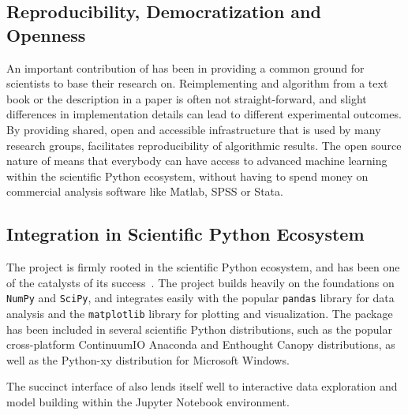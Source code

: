 \subsection{Reproducibility, Democratization and Openness}
An important contribution of \sklearn{} has been in providing a common
ground for scientists to base their research on. Reimplementing
and algorithm from a text book or the description in a paper is often not
straight-forward, and slight differences in implementation details can
lead to different experimental outcomes. By providing shared, open and 
accessible infrastructure that is used by many research groups,
\sklearn{} facilitates reproducibility of algorithmic results.
The open source nature of \sklearn{} means that everybody can have access
to advanced machine learning within the scientific Python ecosystem,
without having to spend money on commercial analysis software like Matlab,
SPSS or Stata.

\subsection{Integration in Scientific Python Ecosystem}
The \sklearn{} project is firmly rooted in the scientific Python ecosystem, and has been
one of the catalysts of its success~\autocite{benlorica, infoworld}. The \sklearn{} project{}
builds heavily on the foundations on \texttt{NumPy} and \texttt{SciPy}, and
integrates easily with the popular \texttt{pandas} library for data analysis and the
\texttt{matplotlib} library for plotting and visualization.
The \sklearn{} package has been included in several scientific Python distributions, such
as the popular cross-platform ContinuumIO Anaconda and Enthought Canopy
distributions, as well as the Python-xy distribution for Microsoft Windows.

The succinct interface of \sklearn{} also lends itself well to interactive
data exploration and model building within the Jupyter Notebook environment.

